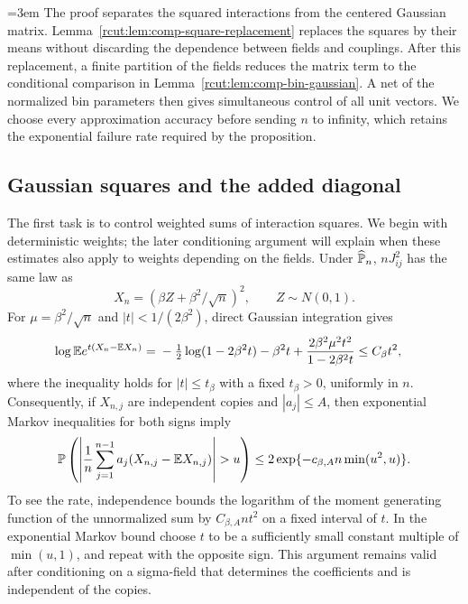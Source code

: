 {\emergencystretch=3em
The proof separates the squared interactions from the centered Gaussian
matrix.  Lemma~\ref{rcut:lem:comp-square-replacement} replaces the squares
by their means without discarding the dependence between fields and
couplings.  After this replacement, a finite partition of the fields
reduces the matrix term to the conditional comparison in
Lemma~\ref{rcut:lem:comp-bin-gaussian}.  A net of the normalized bin
parameters then gives simultaneous control of all unit vectors.  We
choose every approximation accuracy before sending $n$ to infinity,
which retains the exponential failure rate required by the proposition.\par}

\subsection{Gaussian squares and the added diagonal}

The first task is to control weighted sums of interaction squares.
We begin with deterministic weights; the later conditioning argument
will explain when these estimates also apply to weights depending on
the fields.  Under $\widehat\P_n$,
$nJ_{ij}^2$ has the same law as
\[
 X_n=(\beta Z+\beta^2/\sqrt n)^2,\qquad Z\sim N(0,1).
\]
For $\mu=\beta^2/\sqrt n$ and $|t|<1/(2\beta^2)$, direct Gaussian
integration gives
\begin{align}
 \log\E e^{t(X_n-\E X_n)}
  ={}&-\tfrac12\log(1-2\beta^2t)-\beta^2t
      +\frac{2\beta^2\mu^2t^2}{1-2\beta^2t}
      \le C_\beta t^2,
 \label{rcut:eq:comp-square-mgf}
\end{align}
where the inequality holds for $|t|\le t_\beta$ with a fixed
$t_\beta>0$, uniformly in $n$.
Consequently, if $X_{n,j}$ are independent copies and $|a_j|\le A$,
then exponential Markov inequalities for both signs imply
\begin{equation}
 \P\left(\left|\frac1n\sum_{j=1}^{n-1}
       a_j(X_{n,j}-\E X_{n,j})\right|>u\right)
 \le 2\exp\{-c_{\beta,A}n\min(u^2,u)\}.
 \label{rcut:eq:comp-weighted-square-tail}
\end{equation}
To see the rate, independence bounds the logarithm of the moment
generating function of the unnormalized sum by $C_{\beta,A}nt^2$ on
a fixed interval of $t$.  In the exponential Markov bound choose $t$
to be a sufficiently small constant multiple of $\min(u,1)$, and repeat
with the opposite sign.  This argument remains valid after conditioning
on a sigma-field that determines the coefficients and is independent
of the copies.

